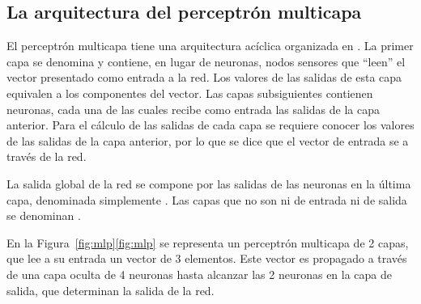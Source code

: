 %
%
\subsection{La arquitectura del perceptrón multicapa}
%
El perceptrón multicapa tiene una arquitectura acíclica organizada en
.
La primer capa se denomina  y contiene, en lugar de
neuronas, nodos sensores que ``leen'' el vector presentado como
entrada a la red.
Los valores de las salidas de esta capa equivalen a los componentes
del vector.
Las capas subsiguientes contienen neuronas, cada una de las cuales
recibe como entrada  las salidas de la capa anterior.
Para el cálculo de las salidas de cada capa se requiere conocer los
valores de las salidas de la capa anterior, por lo que se dice que el
vector de entrada se  a través de la red.

La salida global de la red se compone por las salidas de las neuronas
en la última capa, denominada simplemente .
Las capas que no son ni de entrada ni de salida se denominan .

En la \iflatexml{}Figura~\ref{fig:mlp}\else\autoref{fig:mlp}\fi{} se
representa un perceptrón multicapa de 2 capas, que lee a su entrada un
vector de 3 elementos.
Este vector es propagado a través de una capa oculta de 4 neuronas
hasta alcanzar las 2 neuronas en la capa de salida, que determinan la
salida de la red.
